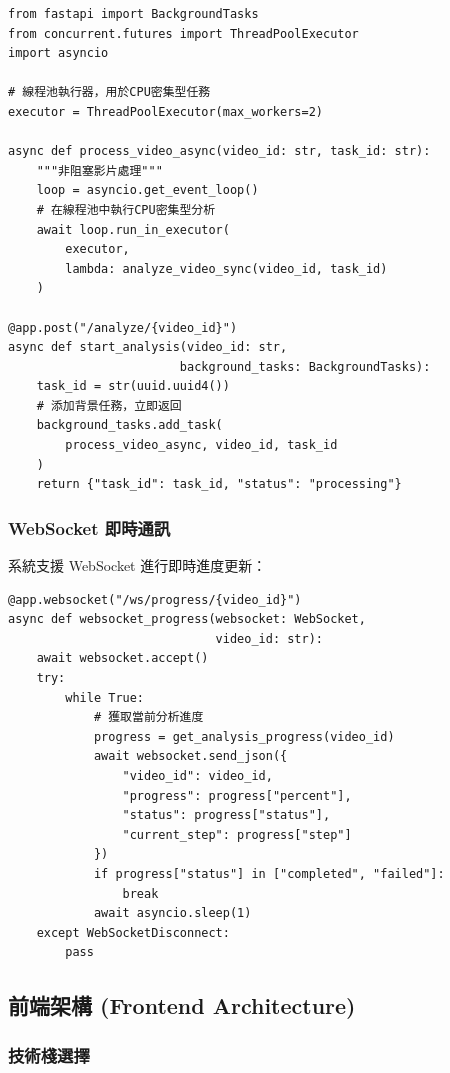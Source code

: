 \documentclass[a4paper,14pt,oneside]{article}
\begin{document}
\begin{lstlisting}[style=pythonstyle, caption={非阻塞分析實作}]
from fastapi import BackgroundTasks
from concurrent.futures import ThreadPoolExecutor
import asyncio

# 線程池執行器，用於CPU密集型任務
executor = ThreadPoolExecutor(max_workers=2)

async def process_video_async(video_id: str, task_id: str):
    """非阻塞影片處理"""
    loop = asyncio.get_event_loop()
    # 在線程池中執行CPU密集型分析
    await loop.run_in_executor(
        executor,
        lambda: analyze_video_sync(video_id, task_id)
    )

@app.post("/analyze/{video_id}")
async def start_analysis(video_id: str,
                        background_tasks: BackgroundTasks):
    task_id = str(uuid.uuid4())
    # 添加背景任務，立即返回
    background_tasks.add_task(
        process_video_async, video_id, task_id
    )
    return {"task_id": task_id, "status": "processing"}
\end{lstlisting}

\subsubsection{WebSocket 即時通訊}

系統支援 WebSocket 進行即時進度更新：

\begin{lstlisting}[style=pythonstyle, caption={WebSocket 進度推送}]
@app.websocket("/ws/progress/{video_id}")
async def websocket_progress(websocket: WebSocket,
                             video_id: str):
    await websocket.accept()
    try:
        while True:
            # 獲取當前分析進度
            progress = get_analysis_progress(video_id)
            await websocket.send_json({
                "video_id": video_id,
                "progress": progress["percent"],
                "status": progress["status"],
                "current_step": progress["step"]
            })
            if progress["status"] in ["completed", "failed"]:
                break
            await asyncio.sleep(1)
    except WebSocketDisconnect:
        pass
\end{lstlisting}

\subsection{前端架構 (Frontend Architecture)}

\subsubsection{技術棧選擇}
\end{document}
